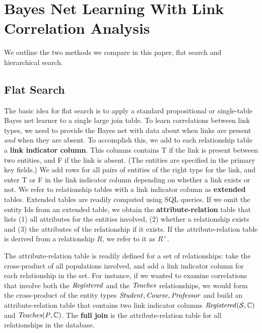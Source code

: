 \documentclass{article}
\begin{document}
\section{Bayes Net Learning With Link Correlation Analysis}

We outline the two methods we compare in this paper, flat search and hierarchical search. 

\subsection{Flat Search}
The basic idea for flat search is to apply a standard propositional or single-table Bayes net learner to a single large join table. 
To learn correlations between link types, we need to provide the Bayes net with data about when links are present {\em and} when they are absent. To accomplish this, we add to each relationship table a \textbf{link indicator column}. This columns contains T if the link is present between two entities, and F if the link is absent. (The entities are specified in the primary key fields.) We add rows for all pairs of entities of the right type for the link, and enter T or F in the link indicator column depending on whether a link exists or not. We refer to relationship tables with a link indicator column as \textbf{extended} tables. Extended tables are readily computed using SQL queries. If we omit the entity Ids from an extended table, we obtain the \textbf{attribute-relation} table that lists (1) all attributes for the entities involved, (2) whether a relationship exists and (3) the attributes of the relationship if it exists. If the attribute-relation table is derived from a relationship $R$, we refer to it as $R^{+}$. 

The attribute-relation table is readily defined for a set of relationships: take the cross-product of all populations involved, and add a link indicator column for each relationship in the set. For instance, if we wanted to examine correlations that involve both the $\mathit{Registered}$ and the $\it{Teaches}$ relationships, we would form the cross-product of the entity types $\it{Student},\it{Course},\it{Professor}$ and build an attribute-relation table that contains two link indicator columns $\mathit{Registered}(\mathcal{S},\mathbb{C})$ and $\it{Teaches}(P,\mathbb{C})$. The \textbf{full join} is the attribute-relation table for all relationships in the database.
 
\end{document}
